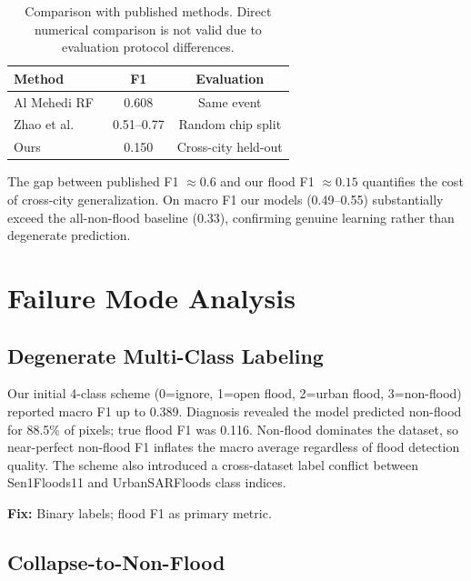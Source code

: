 \documentclass[10pt,twocolumn]{article}
\begin{document}
\begin{table}[h]
\centering\small
\caption{Comparison with published methods.  Direct numerical
  comparison is not valid due to evaluation protocol differences.}
\label{tab:compare}
\begin{tabular}{lcc}
\toprule
Method & F1 & Evaluation \\
\midrule
Al Mehedi RF~\cite{almehedi2025}   & 0.608      & Same event \\
Zhao et al.~\cite{zhao2024}        & 0.51--0.77 & Random chip split \\
Ours                               & 0.150      & Cross-city held-out \\
\bottomrule
\end{tabular}
\end{table}

The gap between published F1 $\approx 0.6$ and our flood F1 $\approx
0.15$ quantifies the cost of cross-city generalization.  On macro F1
our models (0.49--0.55) substantially exceed the all-non-flood baseline
(0.33), confirming genuine learning rather than degenerate prediction.

\section{Failure Mode Analysis}
\label{sec:failure}

\subsection{Degenerate Multi-Class Labeling}
\label{sec:degenerate}

Our initial 4-class scheme (0=ignore, 1=open flood, 2=urban flood,
3=non-flood) reported macro F1 up to 0.389.  Diagnosis revealed the
model predicted non-flood for 88.5\% of pixels; true flood F1 was
0.116.  Non-flood dominates the dataset, so near-perfect non-flood F1
inflates the macro average regardless of flood detection quality.
The scheme also introduced a cross-dataset label conflict between
Sen1Floods11 and UrbanSARFloods class indices.

\textbf{Fix:} Binary labels; flood F1 as primary metric.

\subsection{Collapse-to-Non-Flood}
\label{sec:collapse}
\end{document}
